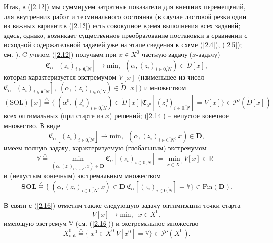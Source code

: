 \documentclass[10pt]{SPIIRAS_Proceedings}
\begin{document}
Итак, в (\ref{2.12})
мы суммируем затратные показатели для внешних перемещений,
для внутренних работ и терминального состояния
(в случае листовой резки один из важных вариантов (\ref{2.12})
есть совокупное время выполнения всех заданий;
здесь, однако,
возникает существенное преобразование постановки
в сравнении с исходной содержательной задачей
уже на этапе сведения к схеме
(\ref{2.4}), (\ref{2.5}); см. \cite[$\S$3.3]{4}).
C учетом (\ref{2.12}) получаем при
$x \in X^0$ частную задачу ($x$-задачу)
\begin{equation}\label{2.13}
  \mathfrak{C}_{\alpha}[(z_i)_{i \in \overline{0,N}}] \longrightarrow
  \mathrm{min},\;\;(\alpha,(z_i)_{i \in \overline{0,N}}) \in \tilde{D}[x],
\end{equation}
которая характеризуется экстремумом $V[x]$
(наименьшее из чисел
$\mathfrak{C}_{\alpha}[(z_i)_{i \in \overline{0,N}}],\;(\alpha,(z_i)_{i \in \overline{0,N}}) \in \tilde{D}[x])$
и множеством
\begin{equation}\label{2.14}
  (\mathrm{SOL})[x] \stackrel{\triangle}{=}
  \{\;(\alpha^0,(z_i^0)_{i \in \overline{0,N}}) \in \tilde{D}[x] \vert
  \mathfrak{C}_{\alpha^0}[(z_i^0)_{i \in \overline{0,N}}] = V[x]\} \in \mathcal{P}'(\tilde{D}[x])
\end{equation}
всех оптимальных
(при старте из $x$)
решений; (\ref{2.14}) -- непустое конечное множество.
В виде
\begin{equation}\label{2.15}
  \mathfrak{C}_{\alpha}[(z_i)_{i \in \overline{0,N}}] \longrightarrow
  \mathrm{min},\;\;(\alpha,(z_i)_{i \in \overline{0,N}},x) \in \mathbf{D},
\end{equation}
имеем полную задачу, характеризуемую (глобальным) экстремумом
\begin{equation}\label{2.16}
  \mathbb{V} \stackrel{\triangle}{=}
  \min\limits_{(\alpha,(z_i)_{i \in \overline{0,N}},x) \in
  \mathbf{D}}\mathfrak{C}_{\alpha}[(z_i)_{i \in \overline{0,N}}]
  = \min\limits_{x \in X^0} V[x] \in \mathbb{R}_+
\end{equation}
и (непустым конечным) экстремальным множеством
\begin{equation}\label{2.17}
  \mathbf{SOL} \stackrel{\triangle}{=}
  \{\;(\alpha,(z_i)_{i \in \overline{0,N}},x) \in \mathbf{D}
  \vert \mathfrak{C}_{\alpha}[(z_i)_{i \in \overline{0,N}}] =
  \mathbb{V}\} \in \mathrm{Fin}(\mathbf{D}).
\end{equation}

В связи с (\ref{2.16})
отметим также следующую задачу оптимизации точки старта
\begin{equation}\label{2.18}
  V[x] \longrightarrow \mathrm{min},\;\;x \in X^0,
\end{equation}
имеющую экстремум $\mathbb{V}$
(см. (\ref{2.16})) и экстремальное множество
\begin{equation}\label{2.19}
  X^0_{\mathrm{opt}} \stackrel{\triangle}{=} \{\;x^0 \in X^0 \vert V[x^0] = \mathbb{V}\} \in \mathcal{P}'(X^0).
\end{equation}
\end{document}
